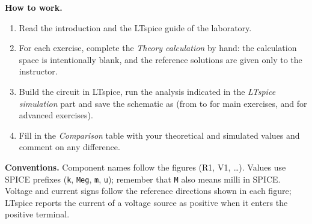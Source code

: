 \documentclass[12pt,twoside]{book}
\begin{document}
\textbf{How to work.}
\begin{enumerate}
  \item Read the introduction and the LTspice guide of the laboratory.
  \item For each exercise, complete the \emph{Theory calculation} by hand: the calculation space is intentionally blank, and the reference solutions are given only to the instructor.
  \item Build the circuit in LTspice, run the analysis indicated in the \emph{LTspice simulation} part and save the schematic as  (from  to  for main exercises,  and  for advanced exercises).
  \item Fill in the \emph{Comparison} table with your theoretical and simulated values and comment on any difference.
\end{enumerate}

\textbf{Conventions.} Component names follow the figures (R1, V1, \dots). Values use SPICE prefixes (\texttt{k}, \texttt{Meg}, \texttt{m}, \texttt{u}); remember that \texttt{M} also means milli in SPICE. Voltage and current signs follow the reference directions shown in each figure; LTspice reports the current of a voltage source as positive when it enters the positive terminal.
\clearpage

\tableofcontents
\clearpage







\end{document}
